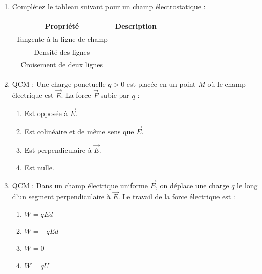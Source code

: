 \documentclass[11pt]{article}
\begin{document}
\begin{exercice}
\begin{enumerate}
    \item Complétez le tableau suivant pour un champ électrostatique :
    \begin{center}
    \begin{tabular}{|c|c|}
    \hline
    \textbf{Propriété} & \textbf{Description} \\
    \hline
    Tangente à la ligne de champ & \underline{\hspace{5cm}} \\
    \hline
    Densité des lignes & \underline{\hspace{5cm}} \\
    \hline
    Croisement de deux lignes & \underline{\hspace{5cm}} \\
    \hline
    \end{tabular}
    \end{center}
    \item QCM : Une charge ponctuelle $q > 0$ est placée en un point $M$ où le champ électrique est $\overrightarrow{E}$. La force $\overrightarrow{F}$ subie par $q$ :
    \begin{enumerate}
        \item Est opposée à $\overrightarrow{E}$.
        \item Est colinéaire et de même sens que $\overrightarrow{E}$.
        \item Est perpendiculaire à $\overrightarrow{E}$.
        \item Est nulle.
    \end{enumerate}
    \item QCM : Dans un champ électrique uniforme $\overrightarrow{E}$, on déplace une charge $q$ le long d'un segment perpendiculaire à $\overrightarrow{E}$. Le travail de la force électrique est :
    \begin{enumerate}
        \item $W = q E d$
        \item $W = - q E d$
        \item $W = 0$
        \item $W = q U$
    \end{enumerate}
\end{enumerate}
\end{exercice}
\end{document}
